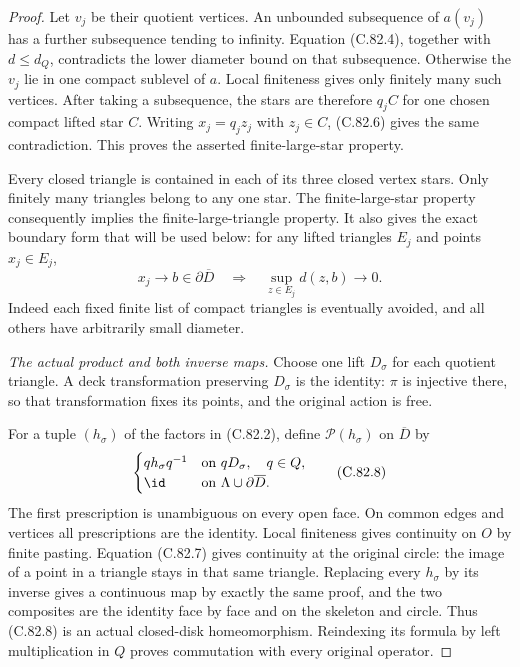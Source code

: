 \begin{proof}
Let $v_j$ be their quotient vertices.
An unbounded subsequence of $a(v_j)$
has a further subsequence tending to
infinity. Equation (C.82.4), together
with $d\leq d_Q$, contradicts the lower
diameter bound on that subsequence.
Otherwise the $v_j$ lie in one compact
sublevel of $a$. Local finiteness gives
only finitely many such vertices.
After taking a subsequence, the stars
are therefore $q_jC$ for one chosen
compact lifted star $C$.
Writing $x_j=q_jz_j$ with $z_j\in C$,
(C.82.6) gives the same contradiction.
This proves the asserted finite-large-star
property.

Every closed triangle is contained in
each of its three closed vertex stars.
Only finitely many triangles belong to
any one star. The finite-large-star
property consequently implies the
finite-large-triangle property. It also
gives the exact boundary form that will
be used below: for any lifted triangles
$E_j$ and points $x_j\in E_j$,
\[
 x_j\longrightarrow b\in\partial\overline D
       \quad\Longrightarrow\quad
       \sup_{z\in E_j}d(z,b)\longrightarrow0.
                                                               \tag{C.82.7}
\]
Indeed each fixed finite list of compact
triangles is eventually avoided, and all
others have arbitrarily small diameter.

\emph{The actual product and both inverse maps.}
Choose one lift $D_\sigma$ for each
quotient triangle. A deck transformation
preserving $D_\sigma$ is the identity:
$\pi$ is injective there, so that
transformation fixes its points, and
the original action is free.

For a tuple $(h_\sigma)$ of the factors
in (C.82.2), define $\mathcal P(h_\sigma)$
on $\overline D$ by
\[
 \begin{cases}
   q h_\sigma q^{-1}&\text{on }qD_\sigma,
                           \quad q\in Q,\\
   \id&\text{on }\Lambda\cup\partial\overline D.
 \end{cases}
                                                               \tag{C.82.8}
\]
The first prescription is unambiguous
on every open face. On common edges
and vertices all prescriptions are
the identity. Local finiteness gives
continuity on $O$ by finite pasting.
Equation (C.82.7) gives continuity at
the original circle: the image of a
point in a triangle stays in that same
triangle. Replacing every $h_\sigma$
by its inverse gives a continuous map
by exactly the same proof, and the two
composites are the identity face by
face and on the skeleton and circle.
Thus (C.82.8) is an actual closed-disk
homeomorphism. Reindexing its formula
by left multiplication in $Q$ proves
commutation with every original operator.


\end{proof}
